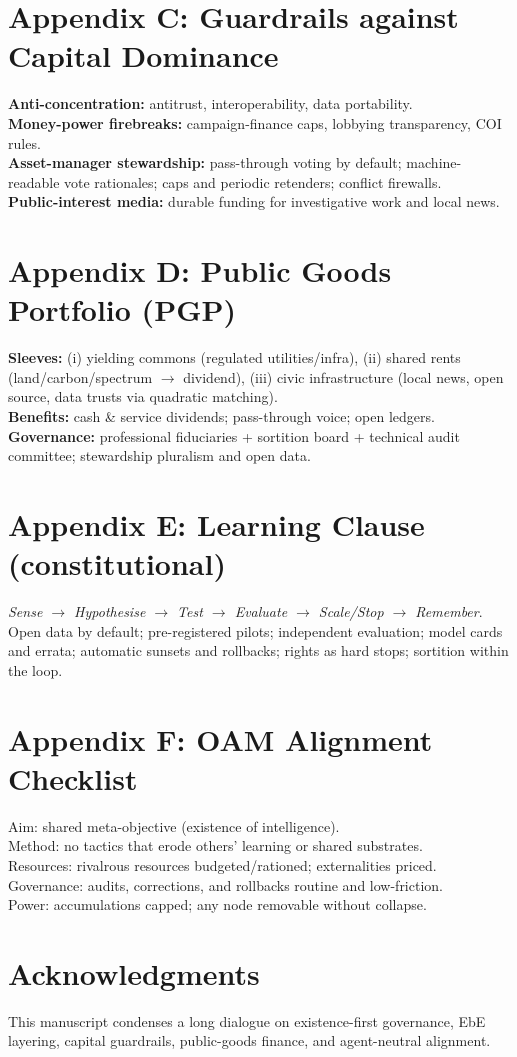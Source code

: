 \documentclass[11pt,a4paper]{article}
\begin{document}
\section*{Appendix C: Guardrails against Capital Dominance}
\textbf{Anti-concentration:} antitrust, interoperability, data portability.\\
\textbf{Money-power firebreaks:} campaign-finance caps, lobbying transparency, COI rules.\\
\textbf{Asset-manager stewardship:} pass-through voting by default; machine-readable vote rationales; caps and periodic retenders; conflict firewalls.\\
\textbf{Public-interest media:} durable funding for investigative work and local news.

\section*{Appendix D: Public Goods Portfolio (PGP)}
\textbf{Sleeves:} (i) yielding commons (regulated utilities/infra), (ii) shared rents (land/carbon/spectrum $\to$ dividend), (iii) civic infrastructure (local news, open source, data trusts via quadratic matching).\\
\textbf{Benefits:} cash \& service dividends; pass-through voice; open ledgers.\\
\textbf{Governance:} professional fiduciaries + sortition board + technical audit committee; stewardship pluralism and open data.

\section*{Appendix E: Learning Clause (constitutional)}
\emph{Sense $\to$ Hypothesise $\to$ Test $\to$ Evaluate $\to$ Scale/Stop $\to$ Remember}.\\
Open data by default; pre-registered pilots; independent evaluation; model cards and errata; automatic sunsets and rollbacks; rights as hard stops; sortition within the loop.

\section*{Appendix F: OAM Alignment Checklist}
Aim: shared meta-objective (existence of intelligence).\\
Method: no tactics that erode others’ learning or shared substrates.\\
Resources: rivalrous resources budgeted/rationed; externalities priced.\\
Governance: audits, corrections, and rollbacks routine and low-friction.\\
Power: accumulations capped; any node removable without collapse.

\section*{Acknowledgments}
This manuscript condenses a long dialogue on existence-first governance, EbE layering, capital guardrails, public-goods finance, and agent-neutral alignment.
\end{document}
